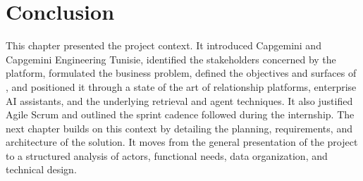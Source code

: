 \section*{Conclusion}
This chapter presented the project context. It introduced Capgemini and Capgemini Engineering Tunisie, identified the stakeholders concerned by the platform, formulated the business problem, defined the objectives and surfaces of \projectname{}, and positioned it through a state of the art of relationship platforms, enterprise AI assistants, and the underlying retrieval and agent techniques. It also justified Agile Scrum and outlined the sprint cadence followed during the internship. The next chapter builds on this context by detailing the planning, requirements, and architecture of the solution. It moves from the general presentation of the project to a structured analysis of actors, functional needs, data organization, and technical design.
